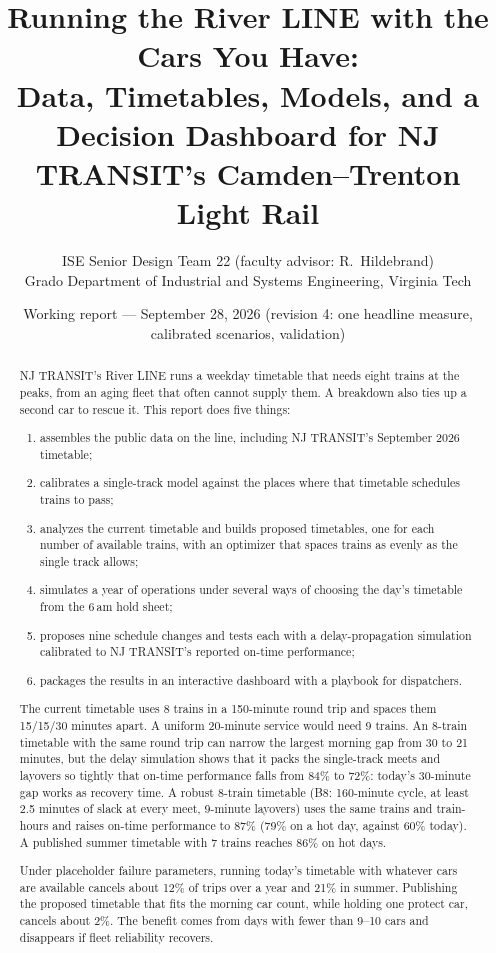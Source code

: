 \documentclass[11pt]{article}
\title{Running the River LINE with the Cars You Have:\\
\large Data, Timetables, Models, and a Decision Dashboard for NJ TRANSIT's Camden--Trenton Light Rail}
\author{ISE Senior Design Team 22 \quad (faculty advisor: R.~Hildebrand)\\Grado Department of Industrial and Systems Engineering, Virginia Tech}
\date{Working report --- September 28, 2026 (revision 4: one headline measure, calibrated scenarios, validation)}
\begin{document}
\maketitle

\begin{abstract}
NJ TRANSIT's River LINE runs a weekday timetable that needs eight trains at the peaks, from an aging fleet that often cannot supply them. A breakdown also ties up a second car to rescue it. This report does five things:
\begin{enumerate}
\item assembles the public data on the line, including NJ TRANSIT's September 2026 timetable;
\item calibrates a single-track model against the places where that timetable schedules trains to pass;
\item analyzes the current timetable and builds proposed timetables, one for each number of available trains, with an optimizer that spaces trains as evenly as the single track allows;
\item simulates a year of operations under several ways of choosing the day's timetable from the 6\,am hold sheet;
\item proposes nine schedule changes and tests each with a delay-propagation simulation calibrated to NJ TRANSIT's reported on-time performance;
\item packages the results in an interactive dashboard with a playbook for dispatchers.
\end{enumerate}
The current timetable uses 8 trains in a 150-minute round trip and spaces them 15/15/30 minutes apart. A uniform 20-minute service would need 9 trains. An 8-train timetable with the same round trip can narrow the largest morning gap from 30 to 21 minutes, but the delay simulation shows that it packs the single-track meets and layovers so tightly that on-time performance falls from 84\% to 72\%: today's 30-minute gap works as recovery time. A robust 8-train timetable (B8: 160-minute cycle, at least 2.5 minutes of slack at every meet, 9-minute layovers) uses the same trains and train-hours and raises on-time performance to 87\% (79\% on a hot day, against 60\% today). A published summer timetable with 7 trains reaches 86\% on hot days.

Under placeholder failure parameters, running today's timetable with whatever cars are available cancels about 12\% of trips over a year and 21\% in summer. Publishing the proposed timetable that fits the morning car count, while holding one protect car, cancels about 2\%. The benefit comes from days with fewer than 9--10 cars and disappears if fleet reliability recovers.


\end{abstract}
\end{document}
